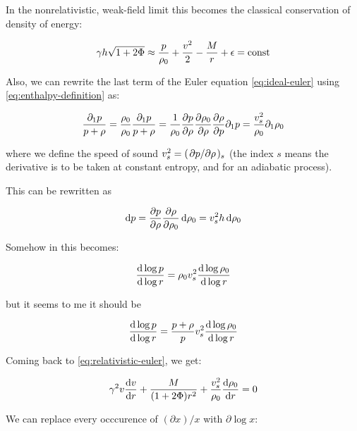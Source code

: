 \documentclass[main.tex]{subfiles}
\begin{document}
In the nonrelativistic, weak-field limit this  becomes the classical conservation of density of energy:

\begin{equation}
    \gamma h \sqrt{1+2\Phi} \approx \frac{p}{\rho_0} + \frac{v^2}{2} - \frac{M}{r} + \epsilon = \const
\end{equation}

Also, we can rewrite the last term of the Euler equation \eqref{eq:ideal-euler} using \eqref{eq:enthalpy-definition}  as:

\begin{equation}
  \frac{\partial_1 p}{p + \rho} =
  \frac{\rho_0}{\rho_0} \frac{\partial_1 p}{p + \rho} =
  \frac{1}{\rho_0} \pdv{p}{\rho} \pdv{\rho_0}{\rho}
  \pdv{\rho}{p}   \partial_1 p =
  \frac{v_s^2}{\rho_0} \partial_1\rho_0
\end{equation}

where we define the speed of sound \(v_s^2 = (\pdv*{p}{\rho})_s\) (the index \(s\) means the derivative is to be taken at constant entropy, and for an adiabatic process).

This can be rewritten as

\begin{equation}
  \dd{p} = \pdv{p}{\rho} \pdv{\rho}{\rho_0} \dd{\rho_0} = v_s^2 h \dd{\rho_0}
\end{equation}

\begin{greenbox}
  Somehow in \cite[page 175]{Nobili:2000} this becomes:

  \begin{equation}
    \dv{\log p }{\log r} = \rho_0 v_s^2 \dv{\log \rho_0}{\log r }
  \end{equation}

  but it seems to me it should be

  \begin{equation}
  \dv{\log p }{\log r} = \frac{p+\rho}{p} v_s^2 \dv{\log \rho_0}{\log r }
  \end{equation}
\end{greenbox}

Coming back to \eqref{eq:relativistic-euler},  we get:

\begin{equation}
  \gamma^2 v \dv{v}{r} + \frac{M}{(1+ 2 \Phi) r^2}
  + \frac{v_s^2 }{\rho_0}\dv{\rho_0}{r} = 0
\end{equation}

We can replace every occcurence of \((\partial x) / x \) with \(\partial \log x \):
\end{document}
